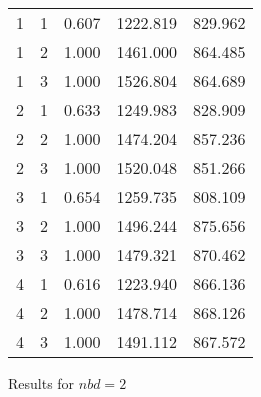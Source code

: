 \documentclass[11pt,a4paper,draft]{article}
\begin{document}
\begin{description}
\begin{figure}[!h]
\begin{tabular}{lllll}
			1 & 1 &  0.607 & 1222.819 & 829.962 \\
			1 & 2 &  1.000 & 1461.000 & 864.485 \\
			1 & 3 &  1.000 & 1526.804 & 864.689 \\
			\hline 
			2 & 1 &  0.633 & 1249.983 & 828.909 \\
			2 & 2 &  1.000 & 1474.204 & 857.236 \\
			2 & 3 &  1.000 & 1520.048 & 851.266 \\
			\hline 
			3 & 1 &  0.654 & 1259.735 & 808.109 \\
			3 & 2 &  1.000 & 1496.244 & 875.656 \\
			3 & 3 &  1.000 & 1479.321 & 870.462 \\
			\hline 
			4 & 1 &  0.616 & 1223.940 & 866.136 \\
			4 & 2 &  1.000 & 1478.714 & 868.126 \\
			4 & 3 &  1.000 & 1491.112 & 867.572 \\
			\hline 
			\hline  
		\end{tabular}
		\caption{Results for $nbd = 2$}
	\end{figure}


\end{description}
\end{document}
